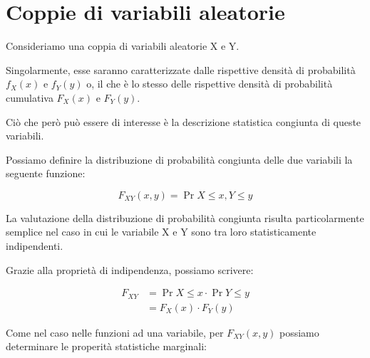 \newpage 

\section{Coppie di variabili aleatorie}

Consideriamo una coppia di variabili aleatorie X e Y. \newline 

Singolarmente, esse saranno caratterizzate dalle rispettive densità di probabilità $f_X (x)$ e $f_Y (y)$ 
o, il che è lo stesso delle rispettive densità di probabilità cumulativa $F_X (x)$ e $F_Y (y)$. \newline 

Ciò che però può essere di interesse è la descrizione statistica congiunta di queste variabili. \newline 

Possiamo definire la distribuzione di probabilità congiunta delle due variabili la seguente funzione: 

{
    \Large 
    \begin{equation}
        F_{XY} (x, y) = \Pr{X \leq x, Y \leq y}
    \end{equation}
}

La valutazione della distribuzione di probabilità congiunta risulta particolarmente semplice nel caso in cui le variabile X e Y sono tra loro statisticamente indipendenti. \newline 


Grazie alla proprietà di indipendenza, possiamo scrivere: 

{
    \Large 
    \begin{equation}
        \begin{split}
            F_{XY} 
            &= 
            \Pr{X \leq x} \cdot \Pr{Y \leq y} 
            \\
            &= 
            F_X (x) \cdot F_Y (y) 
        \end{split}
    \end{equation}
}

Come nel caso nelle funzioni ad una variabile, per $F_{XY} (x, y)$ possiamo determinare 
le properità statistiche marginali: 

